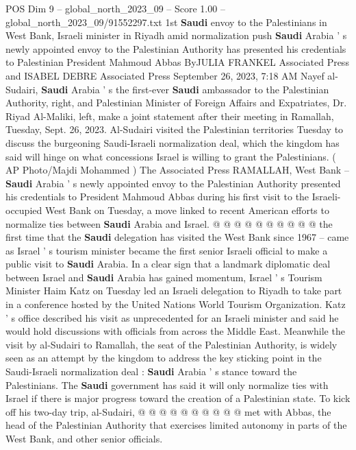 \begin{textsample}{POS Dim 9 – global\_north\_2023\_09 – Score 1.00 – global\_north\_2023\_09/91552297.txt}  \label{ex:f9_pos_013}
1st \textbf{Saudi} envoy to the Palestinians in West Bank, Israeli minister in Riyadh amid normalization push \textbf{Saudi} Arabia ' s newly appointed envoy to the Palestinian Authority has presented his credentials to Palestinian President Mahmoud Abbas ByJULIA FRANKEL Associated Press and ISABEL DEBRE Associated Press September 26, 2023, 7:18 AM Nayef al-Sudairi, \textbf{Saudi} Arabia ' s the first-ever \textbf{Saudi} ambassador to the Palestinian Authority, right, and Palestinian Minister of Foreign Affairs and Expatriates, Dr.
Riyad Al-Maliki, left, make a joint statement after their meeting in Ramallah, Tuesday, Sept. 26, 2023.
Al-Sudairi visited the Palestinian territories Tuesday to discuss the burgeoning Saudi-Israeli normalization deal, which the kingdom has said will hinge on what concessions Israel is willing to grant the Palestinians. ( AP Photo/Majdi Mohammed ) The Associated Press RAMALLAH, West Bank -- \textbf{Saudi} Arabia ' s newly appointed envoy to the Palestinian Authority presented his credentials to President Mahmoud Abbas during his first visit to the Israeli-occupied West Bank on Tuesday, a move linked to recent American efforts to normalize ties between \textbf{Saudi} Arabia and Israel. @ @ @ @ @ @ @ @ @ @ the first time that the \textbf{Saudi} delegation has visited the West Bank since 1967 -- came as Israel ' s tourism minister became the first senior Israeli official to make a public visit to \textbf{Saudi} Arabia.
In a clear sign that a landmark diplomatic deal between Israel and \textbf{Saudi} Arabia has gained momentum, Israel ' s Tourism Minister Haim Katz on Tuesday led an Israeli delegation to Riyadh to take part in a conference hosted by the United Nations World Tourism Organization.
Katz ' s office described his visit as unprecedented for an Israeli minister and said he would hold discussions with officials from across the Middle East.
Meanwhile the visit by al-Sudairi to Ramallah, the seat of the Palestinian Authority, is widely seen as an attempt by the kingdom to address the key sticking point in the Saudi-Israeli normalization deal : \textbf{Saudi} Arabia ' s stance toward the Palestinians.
The \textbf{Saudi} government has said it will only normalize ties with Israel if there is major progress toward the creation of a Palestinian state.
To kick off his two-day trip, al-Sudairi, @ @ @ @ @ @ @ @ @ @ met with Abbas, the head of the Palestinian Authority that exercises limited autonomy in parts of the West Bank, and other senior officials.

\end{textsample}
